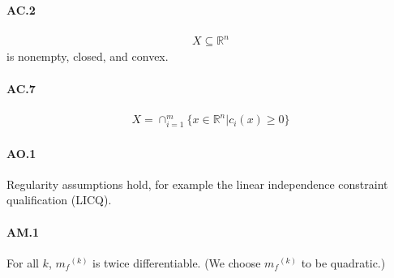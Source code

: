 \documentclass{article}
\theoremstyle{case}
\newcommand{\modelk}{{{m}_f}^{(k)}}
\newcommand{\iteratek}{{x}^{(k)}}
\begin{document}
\paragraph{AC.2}
\begin{align}
X  \subseteq \mathbb R^n
\end{align}
is nonempty, closed, and convex.


\paragraph{AC.7}
\begin{align}
X = \cap_{i=1}^{m} \{x\in\mathbb R^n|c_i(x) \ge 0\}
\end{align}


\paragraph{AO.1}
Regularity assumptions hold, for example the linear independence constraint qualification (LICQ).

\paragraph{AM.1}
For all $k$, $\modelk$ is twice differentiable. (We choose $\modelk$ to be quadratic.)

\end{document}
